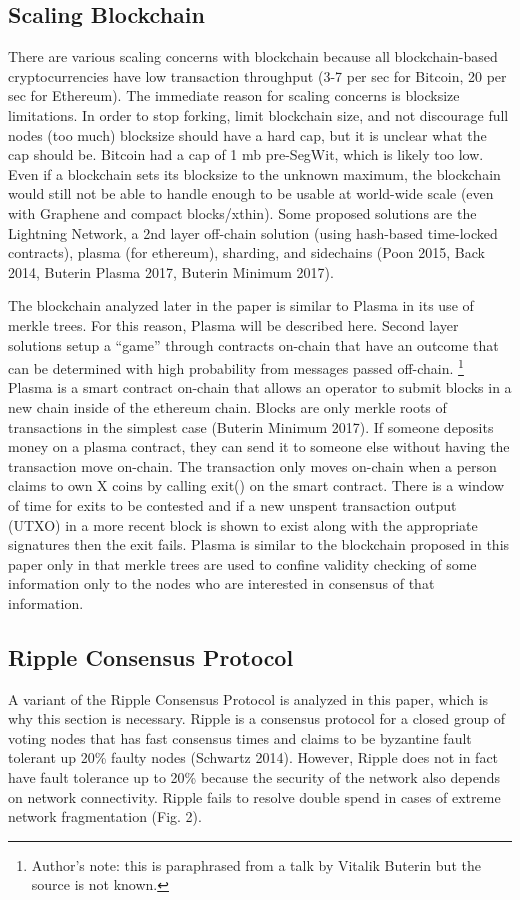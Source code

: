 \documentclass[letterpaper, 10 pt, conference]{ieeeconf}  %
\begin{document}
\subsection{Scaling Blockchain}
There are various scaling concerns with blockchain because all blockchain-based cryptocurrencies have low transaction throughput (3-7 per sec for Bitcoin, 20 per sec for Ethereum). The immediate reason for scaling concerns is blocksize limitations. In order to stop forking, limit blockchain size, and not discourage full nodes (too much) blocksize should have a hard cap, but it is unclear what the cap should be. Bitcoin had a cap of 1 mb pre-SegWit, which is likely too low. Even if a blockchain sets its blocksize to the unknown maximum, the blockchain would still not be able to handle enough to be usable at world-wide scale (even with Graphene and compact blocks/xthin). Some proposed solutions are the Lightning Network, a 2nd layer off-chain solution (using hash-based time-locked contracts), plasma (for ethereum), sharding, and sidechains (Poon 2015, Back 2014, Buterin Plasma 2017, Buterin Minimum 2017). 

The blockchain analyzed later in the paper is similar to Plasma in its use of merkle trees. For this reason, Plasma will be described here. Second layer solutions setup a “game” through contracts on-chain that have an outcome that can be determined with high probability from messages passed off-chain. \footnote{Author's note: this is paraphrased from a talk by Vitalik Buterin but the source is not known.} Plasma is a smart contract on-chain that allows an operator to submit blocks in a new chain inside of the ethereum chain. Blocks are only merkle roots of transactions in the simplest case (Buterin Minimum 2017). If someone deposits money on a plasma contract, they can send it to someone else without having the transaction move on-chain. The transaction only moves on-chain when a person claims to own X coins by calling exit() on the smart contract. There is a window of time for exits to be contested and if a new unspent transaction output (UTXO) in a more recent block is shown to exist along with the appropriate signatures then the exit fails. Plasma is similar to the blockchain proposed in this paper only in that merkle trees are used to confine validity checking of some information only to the nodes who are interested in consensus of that information. 

\subsection{Ripple Consensus Protocol}
A variant of the Ripple Consensus Protocol is analyzed in this paper, which is why this section is necessary. Ripple is a consensus protocol for a closed group of voting nodes that has fast consensus times and claims to be byzantine fault tolerant up 20\% faulty nodes (Schwartz 2014). However, Ripple does not in fact have fault tolerance up to 20\% because the security of the network also depends on network connectivity. Ripple fails to resolve double spend in cases of extreme network fragmentation (Fig. 2).
\end{document}
